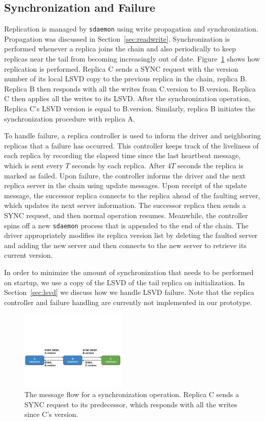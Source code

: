 \subsection{Synchronization and Failure}
\label{sec:replication}
Replication is managed by \texttt{sdaemon} using write propagation and 
synchronization. Propagation was discussed in Section~\ref{sec:readwrite}. 
Synchronization is performed whenever a replica joins the chain and also 
periodically to keep replicas near the tail from becoming increasingly out 
of date. Figure~\ref{fig:sync} shows how replication is performed. Replica C sends a SYNC request with the version number of its local LSVD 
copy to the previous replica in the chain, replica B. Replica B then responds
with all the writes from C.version to B.version. Replica C then applies all 
the writes to its LSVD. After the synchronization operation, Replica C's 
LSVD version is equal to B.version. Similarly, replica B initiates the 
synchronization procedure with replica A.

To handle failure, a replica controller is used to inform the driver and 
neighboring replicas that a failure has occurred. This controller keeps track 
of the liveliness of each replica by recording the elapsed time since the 
last heartbeat message, which is sent every $T$ seconds by each replica. 
After $4T$ seconds the replica is marked as failed. Upon failure, the 
controller informs the driver and the next replica server in the 
chain using update messages. Upon receipt of the update message, the 
successor replica connects to the replica ahead of the faulting server, which
updates its next server information. The successor replica then sends a SYNC 
request, and then normal operation resumes. Meanwhile, the controller spins 
off a new \texttt{sdaemon} process that is appended to the end of the chain. 
The driver appropriately modifies its replica version list by deleting the
faulted server and adding the new server and then connects to the new server
to retrieve its current version. 

In order to minimize the amount of synchronization that needs to be 
performed on startup, we use a copy of the LSVD of the tail replica on 
initialization. In Section~\ref{sec:lsvd} we discuss how we handle LSVD
failure. Note that the replica controller and failure handling are currently not 
implemented in our prototype. 

\begin{figure}[t]
    \includegraphics[width=0.45\textwidth, trim=0 2in 0 3in, clip]{./figures/sync.pdf}
    \caption{The message flow for a synchronization operation. Replica C 
            sends a SYNC request to its predecessor, which responds with all
            the writes since C's version.}
    \label{fig:sync}
\end{figure}

